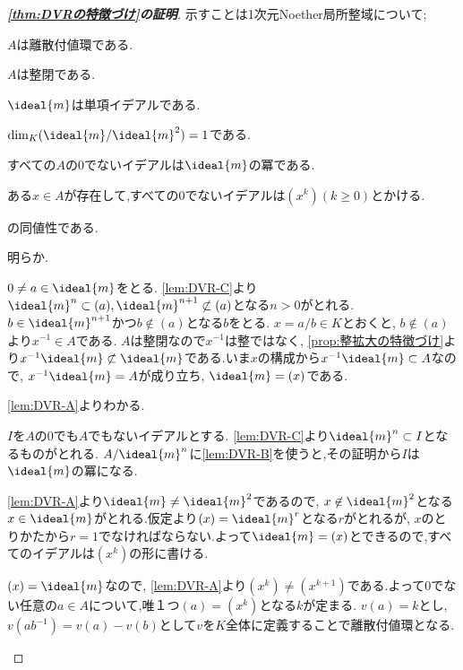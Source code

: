 \begin{proof}[\textbf{\ref{thm:DVRの特徴づけ}の証明}]
	示すことは1次元Noether局所整域について;
	\begin{sakura}
		\item $A$は離散付値環である.
		\item $A$は整閉である.
		\item $\ideal{m}$は単項イデアルである.
		\item $\dim_K (\ideal{m}/\ideal{m}^2)=1$である.
		\item すべての$A$の0でないイデアルは$\ideal{m}$の冪である.
		\item ある$x\in A$が存在して,すべての0でないイデアルは$(x^k) (k\geq0)$とかける.
	\end{sakura}
	の同値性である.
	
	\begin{eqv}[6]
		\item 明らか.
		\item $0\neq a\in\ideal{m}$をとる. \ref{lem:DVR-C}より$\ideal{m}^n\subset(a),\ideal{m}^{n+1}\not\subset(a)$となる$n>0$がとれる. $b\in\ideal{m}^{n+1}$かつ$b\not\in(a)$となる$b$をとる. $x=a/b\in K$とおくと, $b\not\in(a)$より$x^{-1}\in A$である. $A$は整閉なので$x^{-1}$は整ではなく, \ref{prop:整拡大の特徴づけ}より$x^{-1}\ideal{m}\not\subset\ideal{m}$である.いま$x$の構成から$x^{-1}\ideal{m}\subset A$なので, $x^{-1}\ideal{m}=A$が成り立ち, $\ideal{m}=(x)$である.
		
		\item \ref{lem:DVR-A}よりわかる.
		
		\item $I$を$A$の$0$でも$A$でもないイデアルとする. \ref{lem:DVR-C}より$\ideal{m}^n\subset I$となるものがとれる. $A/\ideal{m}^n$に\ref{lem:DVR-B}を使うと,その証明から$I$は$\ideal{m}$の冪になる.
		
		\item \ref{lem:DVR-A}より$\ideal{m}\neq\ideal{m}^2$であるので, $x\not\in\ideal{m}^2$となる$x\in\ideal{m}$がとれる.仮定より$(x)=\ideal{m}^r$となる$r$がとれるが, $x$のとりかたから$r=1$でなければならない.よって$\ideal{m}=(x)$とできるので,すべてのイデアルは$(x^k)$の形に書ける.
		
		\item $(x)=\ideal{m}$なので, \ref{lem:DVR-A}より$(x^k)\neq(x^{k+1})$である.よって0でない任意の$a\in A$について,唯１つ$(a)=(x^k)$となる$k$が定まる. $v(a)=k$とし, $v(ab^{-1})=v(a)-v(b)$として$v$を$K$全体に定義することで離散付値環となる.
	\end{eqv}
\end{proof}

